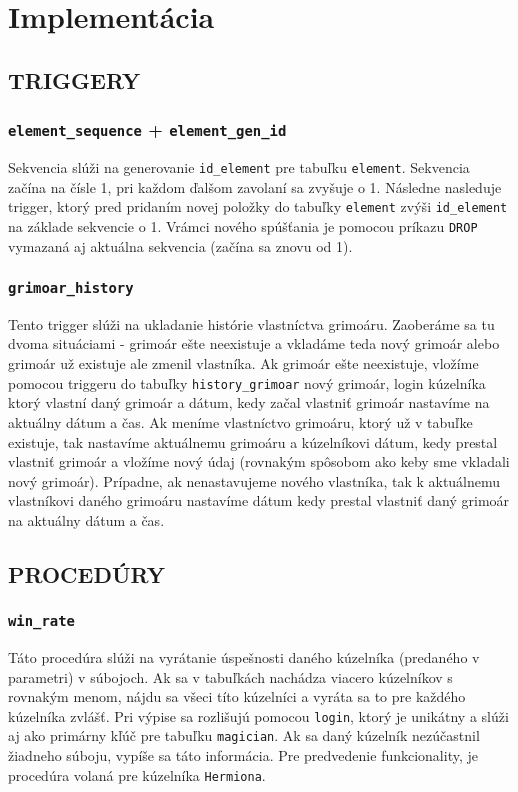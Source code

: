 \documentclass{article}
\begin{document}
\section{Implementácia}
\subsection{TRIGGERY}
\subsubsection{\texttt{element\_sequence} + \texttt{element\_gen\_id}}
Sekvencia slúži na generovanie \texttt{id\_element} pre tabuľku \texttt{element}. Sekvencia začína na čísle 1, pri každom ďalšom zavolaní sa zvyšuje o 1. Následne nasleduje trigger, ktorý pred pridaním novej položky do tabuľky \texttt{element} zvýši \texttt{id\_element} na základe sekvencie o 1. Vrámci nového spúšťania je pomocou príkazu \texttt{DROP} vymazaná aj aktuálna sekvencia (začína sa znovu od 1).
\subsubsection{\texttt{grimoar\_history}}
Tento trigger slúži na ukladanie histórie vlastníctva grimoáru. Zaoberáme sa tu dvoma situáciami - grimoár ešte neexistuje a vkladáme teda nový grimoár alebo grimoár už existuje ale zmenil vlastníka. \newline
Ak grimoár ešte neexistuje, vložíme pomocou triggeru do tabuľky \texttt{history\_grimoar} nový grimoár, login kúzelníka ktorý vlastní daný grimoár a dátum, kedy začal vlastniť grimoár nastavíme na aktuálny dátum a čas. 
Ak meníme vlastníctvo grimoáru, ktorý už v tabuľke existuje, tak nastavíme aktuálnemu grimoáru a kúzelníkovi dátum, kedy prestal vlastniť grimoár a vložíme nový údaj (rovnakým spôsobom ako keby sme vkladali nový grimoár). Prípadne, ak nenastavujeme nového vlastníka, tak k aktuálnemu vlastníkovi daného grimoáru nastavíme dátum kedy prestal vlastniť daný grimoár na aktuálny dátum a čas.
\subsection{PROCEDÚRY}
\subsubsection{\texttt{win\_rate}}
Táto procedúra slúži na vyrátanie úspešnosti daného kúzelníka (predaného v parametri) v súbojoch. Ak sa v tabuľkách nachádza viacero kúzelníkov s rovnakým menom, nájdu sa všeci títo kúzelníci a vyráta sa to pre každého kúzelníka zvlášť. Pri výpise sa rozlišujú pomocou \texttt{login}, ktorý je unikátny a slúži aj ako primárny kľúč pre tabuľku \texttt{magician}. Ak sa daný kúzelník nezúčastnil žiadneho súboju, vypíše sa táto informácia. \newline
Pre predvedenie funkcionality, je procedúra volaná pre kúzelníka \texttt{Hermiona}.
\end{document}

